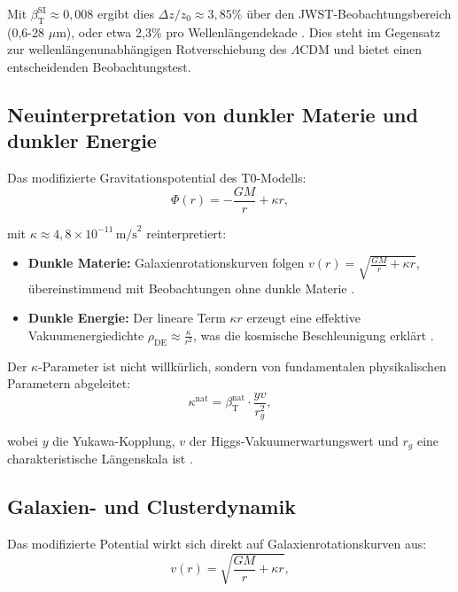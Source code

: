 \documentclass[12pt,a4paper]{article}
\newcommand{\betaT}{\beta_{\text{T}}}
\newcommand{\LCDM}{\Lambda\text{CDM}}
\begin{document}
	Mit \(\betaT^{\text{SI}} \approx 0,008\) ergibt dies \(\Delta z / z_0 \approx 3,85\%\) über den JWST-Beobachtungsbereich (0,6-28 \(\mu\text{m}\)), oder etwa 2,3\% pro Wellenlängendekade \cite{pascher_params_2025}. Dies steht im Gegensatz zur wellenlängenunabhängigen Rotverschiebung des \(\LCDM\) und bietet einen entscheidenden Beobachtungstest.
	
	\subsection{Neuinterpretation von dunkler Materie und dunkler Energie}
	\label{subsec:dark_reinterpretation}
	
	Das modifizierte Gravitationspotential des T0-Modells:
	\begin{equation}
		\Phi(r) = -\frac{GM}{r} + \kappa r,
		\label{eq:grav_potential_t0}
	\end{equation}
	
	mit \(\kappa \approx 4,8 \times 10^{-11} \, \text{m/s}^2\) reinterpretiert:
	\begin{itemize}
		\item \textbf{Dunkle Materie:} Galaxienrotationskurven folgen \(v(r) = \sqrt{\frac{GM}{r} + \kappa r}\), übereinstimmend mit Beobachtungen ohne dunkle Materie \cite{McGaugh2016}.
		\item \textbf{Dunkle Energie:} Der lineare Term \(\kappa r\) erzeugt eine effektive Vakuumenergiedichte \(\rho_{\text{DE}} \approx \frac{\kappa}{r^2}\), was die kosmische Beschleunigung erklärt \cite{pascher_galaxies_2025}.
	\end{itemize}
	
	Der \(\kappa\)-Parameter ist nicht willkürlich, sondern von fundamentalen physikalischen Parametern abgeleitet:
	\begin{equation}
		\kappa^{\text{nat}} = \betaT^{\text{nat}} \cdot \frac{yv}{r_g^2},
		\label{eq:kappa_derivation}
	\end{equation}
	
	wobei \(y\) die Yukawa-Kopplung, \(v\) der Higgs-Vakuumerwartungswert und \(r_g\) eine charakteristische Längenskala ist \cite{pascher_params_2025}.
	
	\subsection{Galaxien- und Clusterdynamik}
	\label{subsec:galaxy_dynamics}
	
	Das modifizierte Potential wirkt sich direkt auf Galaxienrotationskurven aus:
	\begin{equation}
		v(r) = \sqrt{\frac{GM}{r} + \kappa r},
		\label{eq:rotation_velocity}
	\end{equation}
	
\end{document}
